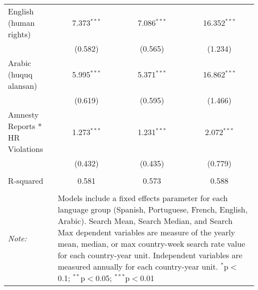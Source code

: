 \begin{table}[!htbp]
\begin{tabular}{@{\extracolsep{5pt}}lccc}
  English (human rights) & 7.373$^{***}$ & 7.086$^{***}$ & 16.352$^{***}$ \\ 
  & (0.582) & (0.565) & (1.234) \\ 
  Arabic (huquq alansan) & 5.995$^{***}$ & 5.371$^{***}$ & 16.862$^{***}$ \\ 
  & (0.619) & (0.595) & (1.466) \\ 
  Amnesty Reports * HR Violations & 1.273$^{***}$ & 1.231$^{***}$ & 2.072$^{***}$ \\ 
  & (0.432) & (0.435) & (0.779) \\ 
 \hline \\[-1.8ex] 
R-squared  & 0.581 & 0.573 & 0.588 \\ 
\hline 
\hline \\[-1.8ex] 
\textit{Note:}  & \multicolumn{3}{l}{\parbox[t]{8cm}{Models include a fixed effects parameter for each language group (Spanish, Portuguese, French, English, Arabic). Search Mean, Search Median, and Search Max dependent variables are measure of the yearly mean, median, or max country-week search rate value for each country-year unit. Independent variables are measured annually for each country-year unit. $^{*}$p$<$0.1; $^{**}$p$<$0.05; $^{***}$p$<$0.01}} \\ 
\end{tabular} 
\end{table} 
